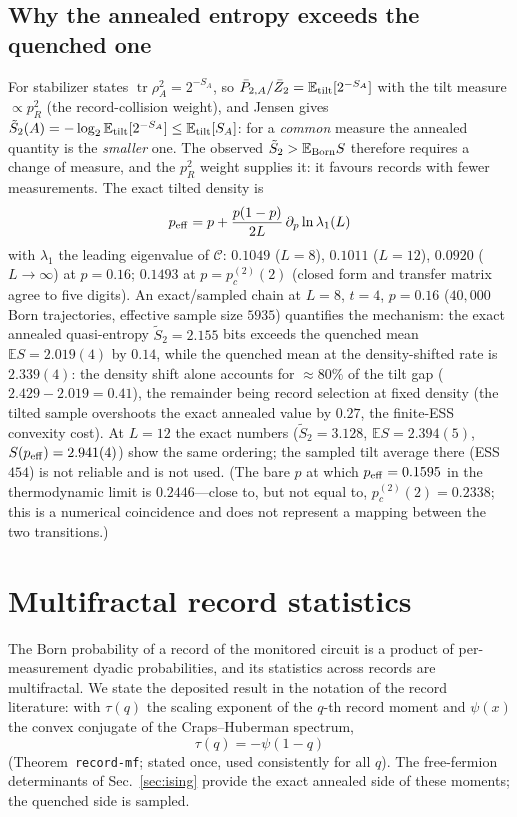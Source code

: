 \documentclass[11pt]{article}
\newcommand{\pctwo}{p_c^{(2)}}
\newcommand{\Ccomp}{\mathcal{C}}
\newcommand{\tr}{\operatorname{tr}}
\newcommand{\E}{\mathbb{E}}
\begin{document}
\subsection{Why the annealed entropy exceeds the quenched one}
\label{sec:tilt}
For stabilizer states $\tr\rho_A^2=2^{-S_A}$, so
$\bar P_{2,A}/\bar Z_2=\E_{\rm tilt}[2^{-S_A}]$ with the tilt measure
$\propto p_R^2$ (the record-collision weight), and Jensen gives
$\tilde S_2(A)=-\log_2\E_{\rm tilt}[2^{-S_A}]\le\E_{\rm tilt}[S_A]$: for a
\emph{common} measure the annealed quantity is the \emph{smaller} one.  The
observed $\tilde S_2>\E_{\rm Born}S$ therefore requires a change of measure,
and the $p_R^2$ weight supplies it: it favours records with fewer
measurements.  The exact tilted density is
\begin{equation}
  p_{\rm eff}=p+\frac{p(1-p)}{2L}\,\partial_p\ln\lambda_1(L)
  \label{eq:peff}
\end{equation}
with $\lambda_1$ the leading eigenvalue of $\Ccomp$: $0.1049$ ($L=8$),
$0.1011$ ($L=12$), $0.0920$ ($L\to\infty$) at $p=0.16$; $0.1493$ at
$p=\pctwo(2)$ (closed form and transfer matrix agree to five digits).  An
exact/sampled chain at $L=8$, $t=4$, $p=0.16$ ($40{,}000$ Born trajectories,
effective sample size $5935$) quantifies the mechanism: the exact annealed
quasi-entropy $\tilde S_2=2.155$ bits exceeds the quenched mean
$\E S=2.019(4)$ by $0.14$, while the quenched mean at the density-shifted
rate is $2.339(4)$: the density shift alone accounts for
${\approx}80\%$ of the tilt gap ($2.429-2.019=0.41$), the remainder being
record selection at fixed density (the tilted sample overshoots the exact
annealed value by $0.27$, the finite-ESS convexity cost).  At $L=12$ the
exact numbers ($\tilde S_2=3.128$, $\E S=2.394(5)$, $S(p_{\rm eff})=2.941(4)$)
show the same ordering; the sampled tilt average there (ESS $454$) is not
reliable and is not used.  (The bare $p$ at which $p_{\rm eff}=0.1595$ in the
thermodynamic limit is $0.2446$---close to, but not equal to,
$\pctwo(2)=0.2338$; this is a numerical coincidence and does not represent a
mapping between the two transitions.)

\section{Multifractal record statistics}\label{sec:records}

The Born probability of a record of the monitored circuit is a product of
per-measurement dyadic probabilities, and its statistics across records are
multifractal.  We state the deposited result in the notation of the record
literature: with $\tau(q)$ the scaling exponent of the $q$-th record moment
and $\psi(x)$ the convex conjugate of the Craps--Huberman spectrum,
\begin{equation}
  \tau(q)=-\psi(1-q)
  \label{eq:taupsi}
\end{equation}
(Theorem~\texttt{record-mf}; stated once, used consistently for all $q$).
The free-fermion determinants of Sec.~\ref{sec:ising} provide the exact
annealed side of these moments; the quenched side is sampled.
\end{document}
